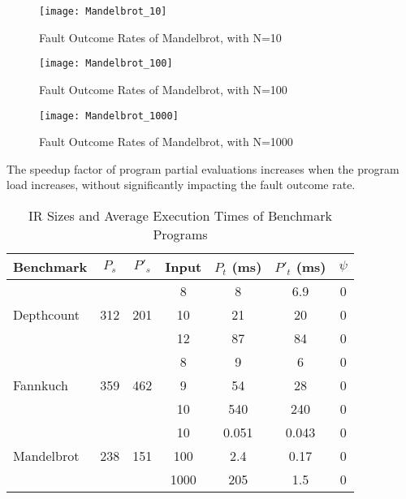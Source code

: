 \begin{figure}[htbp]
  \centering
  \texttt{[image: Mandelbrot\_10]}
  \caption{Fault Outcome Rates of Mandelbrot, with N=10}
  \label{fig:Mandelbrot_10}
\end{figure}

\begin{figure}[htbp]
  \centering
  \texttt{[image: Mandelbrot\_100]}
  \caption{Fault Outcome Rates of Mandelbrot, with N=100}
  \label{fig:Mandelbrot_100}
\end{figure}

\begin{figure}[htbp]
  \centering
  \texttt{[image: Mandelbrot\_1000]}
  \caption{Fault Outcome Rates of Mandelbrot, with N=1000}
  \label{fig:Mandelbrot_1000}
\end{figure}


\begin{obs}
  \label{obs:density}
  The speedup factor of program partial evaluations increases when the program load increases, without significantly impacting the fault outcome rate.   
\end{obs}

\begin{table}[htbp]
\small{
\begin{center}
    \begin{tabular}{|p{1.7cm}|c|c|c|c|c|c|}
    \hline
    \textbf{Benchmark} & \textbf{$P_s$} & \textbf{$P'_s$} &  \textbf{Input} & \textbf{$P_t$ (ms)} & \textbf{$P'_t$ (ms)} & $\psi$ \\ \hline
    \multirow{3}{*}{Depthcount}
    & & & 8 & 8 & 6.9 & 0\\
	& 312 & 201 & 10 & 21 & 20 & 0 \\
 	& & & 12 & 87 & 84 & 0 \\ \hline
 	\multirow{3}{*}{Fannkuch}
    & & & 8 & 9 & 6 & 0\\
	& 359 & 462 & 9 & 54 & 28 & 0 \\
 	& & & 10 & 540 & 240 & 0 \\ \hline
 	\multirow{3}{*}{Mandelbrot}
    & & & 10 & 0.051 & 0.043 & 0\\
	& 238 & 151 & 100 & 2.4 & 0.17 & 0 \\
 	& & & 1000 & 205 & 1.5 & 0 \\ \hline
    \hline
    \end{tabular}
    \end{center}
    }
    \caption{IR Sizes and Average Execution Times of Benchmark Programs}
    \label{tab:benchmarks}
\end{table}
